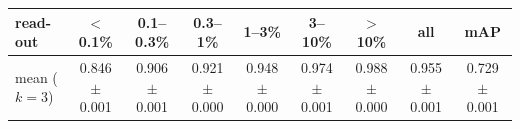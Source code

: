 \begin{tabular}{lcccccccc}
\toprule
read-out & $<$0.1\% & 0.1--0.3\% & 0.3--1\% & 1--3\% & 3--10\% & $>$10\% & all & mAP \\
\midrule
mean ($k=3$) & 0.846 $\pm$ 0.001 & 0.906 $\pm$ 0.001 & 0.921 $\pm$ 0.000 & 0.948 $\pm$ 0.000 & 0.974 $\pm$ 0.001 & 0.988 $\pm$ 0.000 & 0.955 $\pm$ 0.001 & 0.729 $\pm$ 0.001 \\
\bottomrule
\end{tabular}
